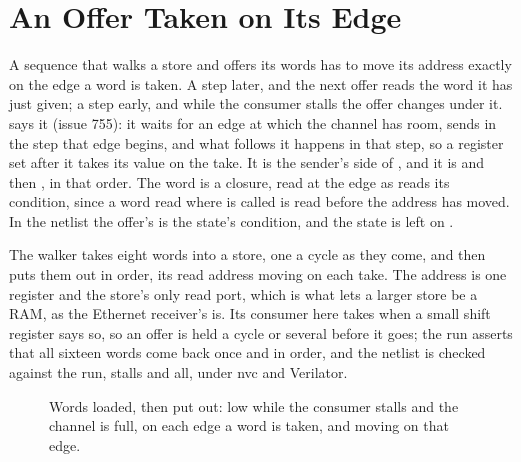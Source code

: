 \section{An Offer Taken on Its Edge}
\label{sec:x-put}

A sequence that walks a store and offers its words has to move its
address exactly on the edge a word is taken. A step later, and the
next offer reads the word it has just given; a step early, and while
the consumer stalls the offer changes under it.
 says it (issue 755): it waits for an edge at
which the channel has room, sends in the step that edge begins, and
what follows it happens in that step, so a register set after it takes its
value on the take. It is the sender's side of , and
it is  and then
, in that order. The word is a closure, read at the
edge as  reads its condition, since a word read where
 is called is read before the address has moved. In the
netlist the offer's  is the state's condition, and the
state is left on .

The walker takes eight words into a store, one a cycle as they come,
and then puts them out in order, its read address  moving on
each take. The address is one register and the store's only read
port, which is what lets a larger store be a RAM, as the Ethernet
receiver's is. Its consumer here takes when a small shift register
says so, so an offer is held a cycle or several before it goes; the
run asserts that all sixteen words come back once and in order, and
the netlist is checked against the run, stalls and all, under nvc and
Verilator.

\begin{figure}[htbp]
\centering

\caption{Words loaded, then put out:  low while the
consumer stalls and the channel is full,  on each
edge a word is taken, and  moving on that edge.}
\label{fig:x-put}
\end{figure}




